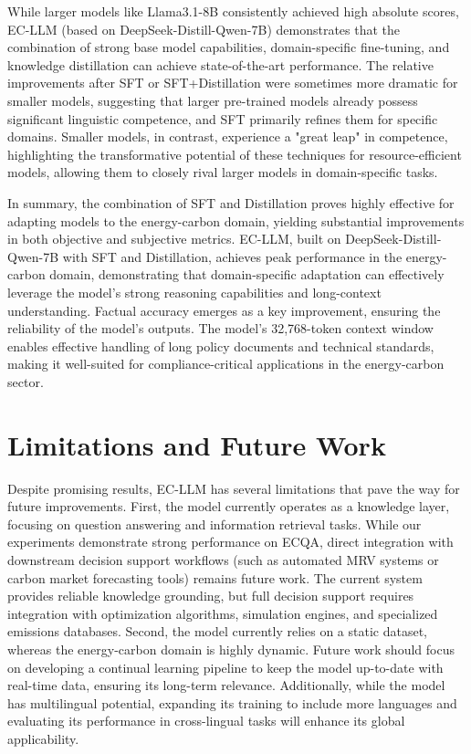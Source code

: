 \documentclass[]{interact}
\theoremstyle{plain}%
\theoremstyle{definition}
\theoremstyle{remark}
\begin{document}
While larger models like Llama3.1-8B consistently achieved high absolute scores, EC-LLM (based on DeepSeek-Distill-Qwen-7B) demonstrates that the combination of strong base model capabilities, domain-specific fine-tuning, and knowledge distillation can achieve state-of-the-art performance. The relative improvements after SFT or SFT+Distillation were sometimes more dramatic for smaller models, suggesting that larger pre-trained models already possess significant linguistic competence, and SFT primarily refines them for specific domains. Smaller models, in contrast, experience a "great leap" in competence, highlighting the transformative potential of these techniques for resource-efficient models, allowing them to closely rival larger models in domain-specific tasks. 

In summary, the combination of SFT and Distillation proves highly effective for adapting models to the energy-carbon domain, yielding substantial improvements in both objective and subjective metrics. EC-LLM, built on DeepSeek-Distill-Qwen-7B with SFT and Distillation, achieves peak performance in the energy-carbon domain, demonstrating that domain-specific adaptation can effectively leverage the model's strong reasoning capabilities and long-context understanding. Factual accuracy emerges as a key improvement, ensuring the reliability of the model's outputs. The model's 32,768-token context window enables effective handling of long policy documents and technical standards, making it well-suited for compliance-critical applications in the energy-carbon sector. 



\section{Limitations and Future Work}\label{sec5}

Despite promising results, EC-LLM has several limitations that pave the way for future improvements. First, the model currently operates as a knowledge layer, focusing on question answering and information retrieval tasks. While our experiments demonstrate strong performance on ECQA, direct integration with downstream decision support workflows (such as automated MRV systems or carbon market forecasting tools) remains future work. The current system provides reliable knowledge grounding, but full decision support requires integration with optimization algorithms, simulation engines, and specialized emissions databases. Second, the model currently relies on a static dataset, whereas the energy-carbon domain is highly dynamic. Future work should focus on developing a continual learning pipeline to keep the model up-to-date with real-time data, ensuring its long-term relevance. Additionally, while the model has multilingual potential, expanding its training to include more languages and evaluating its performance in cross-lingual tasks will enhance its global applicability.
\end{document}
